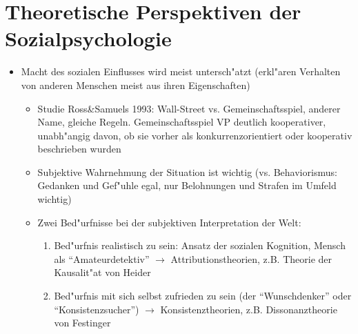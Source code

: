 \section{Theoretische Perspektiven der Sozialpsychologie}
\begin{itemize}
	\item
		Macht des sozialen Einflusses wird meist untersch"atzt (erkl"aren Verhalten von anderen Menschen meist aus ihren Eigenschaften)
		\begin{itemize}
			\item
				Studie Ross\&Samuels 1993: Wall-Street vs. Gemeinschaftsspiel, anderer Name, gleiche Regeln. Gemeinschaftsspiel VP deutlich kooperativer, unabh"angig davon, ob sie vorher als konkurrenzorientiert oder kooperativ beschrieben wurden
			\item
				Subjektive Wahrnehmung der Situation ist wichtig (vs. Behaviorismus: Gedanken und Gef"uhle egal, nur Belohnungen und Strafen im Umfeld wichtig)
			\item
				Zwei Bed"urfnisse bei der subjektiven Interpretation der Welt:
				\begin{enumerate}
					\item
						Bed"urfnis realistisch zu sein: Ansatz der sozialen Kognition, Mensch als \enquote{Amateurdetektiv}  $\rightarrow$  Attributionstheorien, z.B. Theorie der Kausalit"at von Heider
					\item
						Bed"urfnis mit sich selbst zufrieden zu sein (der \enquote{Wunschdenker} oder \enquote{Konsistenzsucher})  $\rightarrow$ Konsistenztheorien, z.B. Dissonanztheorie von Festinger
				\end{enumerate}
		\end{itemize}


\end{itemize}
